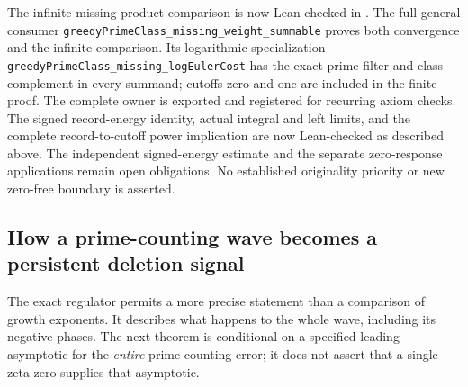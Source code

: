 \documentclass[11pt]{article}
\theoremstyle{definition}
\begin{document}
The infinite missing-product comparison is now Lean-checked in
.
The full general consumer
\texttt{greedyPrimeClass\_\allowbreak missing\_\allowbreak weight\_\allowbreak summable}
proves both convergence and the infinite comparison. Its logarithmic
specialization
\texttt{greedyPrimeClass\_\allowbreak missing\_\allowbreak logEulerCost}
has the exact prime filter and class complement in every summand;
cutoffs zero and one are included in the finite proof.
The complete owner is exported and registered for recurring axiom checks.
The signed record-energy identity, actual integral and left limits,
and the complete record-to-cutoff power implication are now Lean-checked
as described above. The independent signed-energy estimate and the
separate zero-response applications remain open obligations.
No established originality priority or new zero-free boundary is asserted.

\subsection{How a prime-counting wave becomes a persistent deletion signal}
\label{sec:greedy-prime-wave-envelope}

The exact regulator permits a more precise statement than a comparison
of growth exponents. It describes what happens to the whole wave,
including its negative phases. The next theorem is conditional on a
specified leading asymptotic for the \emph{entire} prime-counting error;
it does not assert that a single zeta zero supplies that asymptotic.
\end{document}
